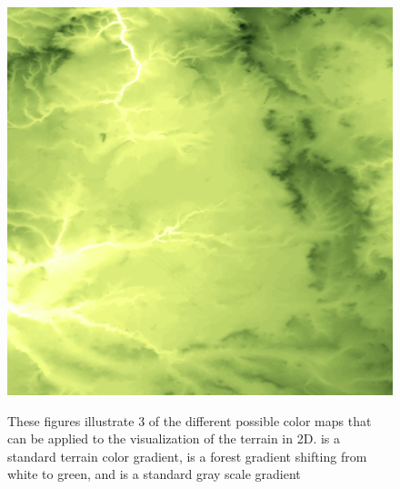 \begin{figure}[ht]
{	\includegraphics[scale=0.3]{images/network_vis/terrain_color_scheme_2.eps}
	\label{fig:oman_color_2}
}
  \caption{These figures illustrate 3 of the different possible color maps that can be applied to the visualization of the terrain in 2D.  is a standard terrain color gradient,  is a forest gradient shifting from white to green, and  is a standard gray scale gradient}
\label{fig:terrain_color_schemes}
\end{figure}

